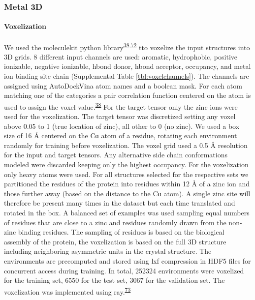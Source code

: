 \documentclass[  ASAPversion,
  ,
  9pt]{elife}
\begin{document}
\hypertarget{metal-3d}{%
\subsubsection{Metal 3D}\label{metal-3d}}

\hypertarget{voxelization}{%
\paragraph{Voxelization}\label{voxelization}}

We used the moleculekit python library\textsuperscript{\protect\hyperlink{ref-mVGaXlum}{38},\protect\hyperlink{ref-q2gxO5bP}{72}} tto voxelize the input structures into 3D grids. 8 different input channels are used: aromatic, hydrophobic, positive ionizable, negative ionizable, hbond donor, hbond acceptor, occupancy, and metal ion binding site chain (Supplemental Table \ref{tbl:voxelchannels}). The channels are assigned using AutoDockVina atom names and a boolean mask. For each atom matching one of the categories a pair correlation function centered on the atom is used to assign the voxel value.\textsuperscript{\protect\hyperlink{ref-mVGaXlum}{38}} For the target tensor only the zinc ions were used for the voxelization. The target tensor was discretized setting any voxel above 0.05 to 1 (true location of zinc), all other to 0 (no zinc). We used a box size of 16 Å centered on the Cɑ atom of a residue, rotating each environment randomly for training before voxelization. The voxel grid used a 0.5 Å resolution for the input and target tensors. Any alternative side chain conformations modeled were discarded keeping only the highest occupancy. For the voxelization only heavy atoms were used. For all structures selected for the respective sets we partitioned the residues of the protein into residues within 12 Å of a zinc ion and those further away (based on the distance to the Cɑ atom). A single zinc site will therefore be present many times in the dataset but each time translated and rotated in the box. A balanced set of examples was used sampling equal numbers of residues that are close to a zinc and residues randomly drawn from the non-zinc binding residues. The sampling of residues is based on the biological assembly of the protein, the voxelization is based on the full 3D structure including neighboring asymmetric units in the crystal structure. The environments are precomputed and stored using lxf compression in HDF5 files for concurrent access during training. In total, 252324 environments were voxelized for the training set, 6550 for the test set, 3067 for the validation set. The voxelization was implemented using ray.\textsuperscript{\protect\hyperlink{ref-19MS2ZVR1}{73}}
\end{document}
